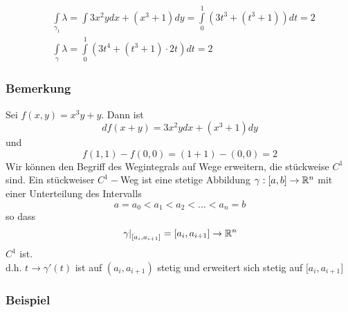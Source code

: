 \begin{enumerate}
\begin{multicols}{2}
\begin{center}
\end{center}
\null\vfill
\end{multicols}
\vspace{-15mm}
\begin{align*}
&\int\limits_{{\gamma _1}} \lambda   = \int {3{x^2}ydx + \left( {{x^3} + 1} \right)dy}  = \int\limits_0^1 {\left( {3{t^3} + \left( {{t^3} + 1} \right)} \right)dt = 2}\\
&\int\limits_\gamma  \lambda   = \int\limits_0^1 {\left( {3{t^4} + \left( {{t^3} + 1} \right) \cdot 2t} \right)dt = 2}
\end{align*}
\subsubsection*{Bemerkung}
Sei $f(x,y)=x^3y+y$. Dann ist  \[df(x+y)=3x^2ydx+\left( x^3+1\right) dy\] und \[f(1,1)-f(0,0)=(1+1)-(0,0)=2\]
Wir können den Begriff des Wegintegrals auf Wege erweitern, die stückweise $C^1$ sind. Ein stückweiser $C^1-$Weg ist eine stetige Abbildung $\gamma :\lbrack a,b\rbrack\to\mathbb{R}^n$ mit einer Unterteilung des Intervalls
\[a=a_0 < a_1 < a_2 < \dots <a_n = b\]
so dass \[{\left. \gamma  \right|_{\left[ {{a_i},{a_{i + 1}}} \right]}} = \left[ {{a_i},{a_{i + 1}}} \right] \to \mathbb{R}^n \] $C^1$ ist.\\

\noindent d.h. $t\to\gamma'(t)$ ist auf $\left( a_i, a_{i+1}\right)$ stetig und erweitert sich stetig auf $\lbrack a_i, a_{i+1}\rbrack$
\subsubsection*{Beispiel}


\end{enumerate}
